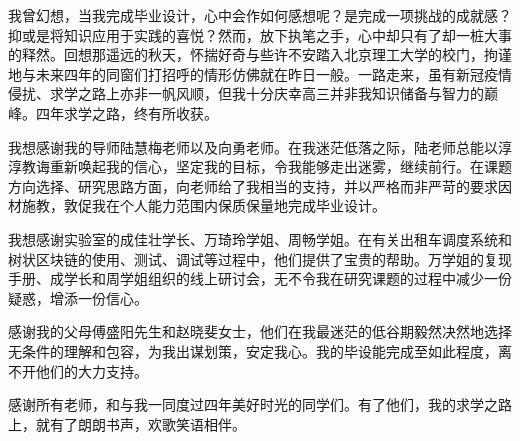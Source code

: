 %
%
%
%
%
%

\begin{acknowledgements}
  我曾幻想，当我完成毕业设计，心中会作如何感想呢？是完成一项挑战的成就感？抑或是将知识应用于实践的喜悦？然而，放下执笔之手，心中却只有了却一桩大事的释然。回想那遥远的秋天，怀揣好奇与些许不安踏入北京理工大学的校门，拘谨地与未来四年的同窗们打招呼的情形仿佛就在昨日一般。一路走来，虽有新冠疫情侵扰、求学之路上亦非一帆风顺，但我十分庆幸高三并非我知识储备与智力的巅峰。四年求学之路，终有所收获。

  我想感谢我的导师陆慧梅老师以及向勇老师。在我迷茫低落之际，陆老师总能以淳淳教诲重新唤起我的信心，坚定我的目标，令我能够走出迷雾，继续前行。在课题方向选择、研究思路方面，向老师给了我相当的支持，并以严格而非严苛的要求因材施教，敦促我在个人能力范围内保质保量地完成毕业设计。

  我想感谢实验室的成佳壮学长、万琦玲学姐、周畅学姐。在有关出租车调度系统和树状区块链的使用、测试、调试等过程中，他们提供了宝贵的帮助。万学姐的复现手册、成学长和周学姐组织的线上研讨会，无不令我在研究课题的过程中减少一份疑惑，增添一份信心。

  感谢我的父母傅盛阳先生和赵晓斐女士，他们在我最迷茫的低谷期毅然决然地选择无条件的理解和包容，为我出谋划策，安定我心。我的毕设能完成至如此程度，离不开他们的大力支持。

  感谢所有老师，和与我一同度过四年美好时光的同学们。有了他们，我的求学之路上，就有了朗朗书声，欢歌笑语相伴。
\end{acknowledgements}
